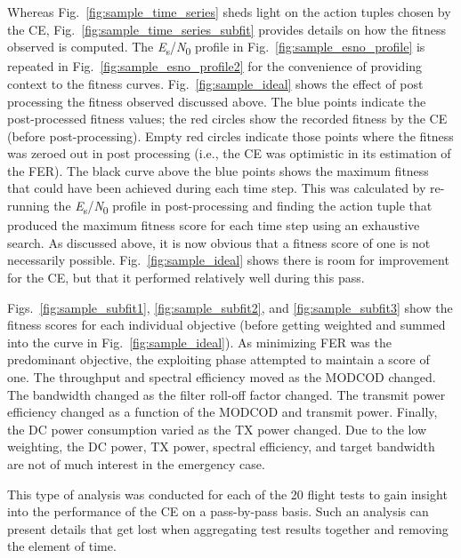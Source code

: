 \documentclass[journal]{IEEEtran}
\begin{document}
Whereas Fig.~\ref{fig:sample_time_series} sheds light on the action tuples chosen by the CE, Fig.~\ref{fig:sample_time_series_subfit} provides details on how the fitness observed is computed.  The \textit{E}\textsubscript{s}/\textit{N}\textsubscript{0} profile in Fig.~\ref{fig:sample_esno_profile} is repeated in Fig.~\ref{fig:sample_esno_profile2} for the convenience of providing context to the fitness curves.  Fig.~\ref{fig:sample_ideal} shows the effect of post processing the fitness observed discussed above.  The blue points indicate the post-processed fitness values; the red circles show the recorded fitness by the CE (before post-processing).  Empty red circles indicate those points where the fitness was zeroed out in post processing (i.e., the CE was optimistic in its estimation of the FER).  The black curve above the blue points shows the maximum fitness that could have been achieved during each time step.  This was calculated by re-running the \textit{E}\textsubscript{s}/\textit{N}\textsubscript{0} profile in post-processing and finding the action tuple that produced the maximum fitness score for each time step using an exhaustive search.  As discussed above, it is now obvious that a fitness score of one is not necessarily possible.  Fig.~\ref{fig:sample_ideal} shows there is room for improvement for the CE, but that it performed relatively well during this pass.

Figs.~\ref{fig:sample_subfit1}, \ref{fig:sample_subfit2}, and \ref{fig:sample_subfit3} show the fitness scores for each individual objective (before getting weighted and summed into the curve in Fig.~\ref{fig:sample_ideal}).  As minimizing FER was the predominant objective, the exploiting phase attempted to maintain a score of one.  The throughput and spectral efficiency moved as the MODCOD changed.  The bandwidth changed as the filter roll-off factor changed.  The transmit power efficiency changed as a function of the MODCOD and transmit power.  Finally, the DC power consumption varied as the TX power changed.  Due to the low weighting, the DC power, TX power, spectral efficiency, and target bandwidth are not of much interest in the emergency case.

This type of analysis was conducted for each of the 20 flight tests to gain insight into the performance of the CE on a pass-by-pass basis.  Such an analysis can present details that get lost when aggregating test results together and removing the element of time.
\end{document}
